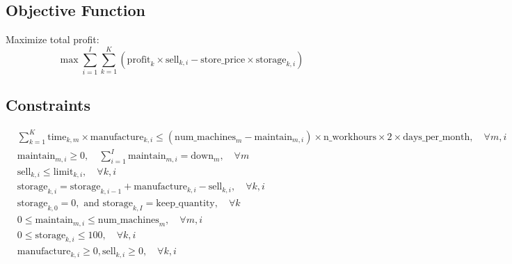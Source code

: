 \documentclass{article}
\begin{document}
\subsection*{Objective Function}
Maximize total profit:
\begin{equation}
\max \sum_{i=1}^{I} \sum_{k=1}^{K} \left( \text{profit}_k \times \text{sell}_{k,i} - \text{store\_price} \times \text{storage}_{k,i} \right)
\end{equation}

\subsection*{Constraints}
\begin{align}
& \sum_{k=1}^{K} \text{time}_{k,m} \times \text{manufacture}_{k,i} \leq \left( \text{num\_machines}_m - \text{maintain}_{m,i} \right) \times \text{n\_workhours} \times 2 \times \text{days\_per\_month}, \quad \forall m, i \\
& \text{maintain}_{m,i} \geq 0, \quad \sum_{i=1}^{I} \text{maintain}_{m,i} = \text{down}_m, \quad \forall m \\
& \text{sell}_{k,i} \leq \text{limit}_{k,i}, \quad \forall k,i \\
& \text{storage}_{k,i} = \text{storage}_{k,i-1} + \text{manufacture}_{k,i} - \text{sell}_{k,i}, \quad \forall k, i \\
& \text{storage}_{k,0} = 0, \text{ and } \text{storage}_{k,I} = \text{keep\_quantity}, \quad \forall k \\
& 0 \leq \text{maintain}_{m,i} \leq \text{num\_machines}_m, \quad \forall m, i \\
& 0 \leq \text{storage}_{k,i} \leq 100, \quad \forall k, i \\
& \text{manufacture}_{k,i} \geq 0, \text{sell}_{k,i} \geq 0, \quad \forall k, i
\end{align}
\end{document}
